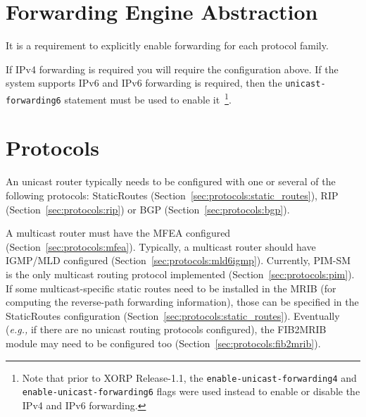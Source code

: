 \documentclass[11pt]{article}
\newcommand{\eg}{\emph{e.g.,}\xspace}
\begin{document}
\section{Forwarding Engine Abstraction}
\label{sec:fea}

It is a requirement to explicitly enable forwarding for each
protocol family.

\vspace{0.1in}
\noindent{}
\vspace{0.1in}

If IPv4 forwarding is required you will require the configuration
above. If the system supports IPv6 and IPv6 forwarding is required,
then the {\tt unicast-forwarding6} statement must be used to enable
it~\footnote{Note that prior to XORP Release-1.1, the
{\tt enable-unicast-forwarding4} and {\tt enable-unicast-forwarding6}
flags were used instead to enable or disable the IPv4 and IPv6 forwarding.}.

\section{Protocols}
\label{sec:protocols}

An unicast router typically needs to be configured with one or several
of the following protocols:
StaticRoutes (Section~\ref{sec:protocols:static_routes}),
RIP (Section~\ref{sec:protocols:rip})
or BGP (Section~\ref{sec:protocols:bgp}).

A multicast router must have the MFEA configured
(Section~\ref{sec:protocols:mfea}). Typically, a multicast router should
have IGMP/MLD configured (Section~\ref{sec:protocols:mld6igmp}).
Currently, PIM-SM is the only multicast routing protocol implemented
(Section~\ref{sec:protocols:pim}). If some multicast-specific static
routes need to be installed in the MRIB (for computing the reverse-path
forwarding information), those can be specified in the StaticRoutes
configuration (Section~\ref{sec:protocols:static_routes}).
Eventually (\eg if there are no
unicast routing protocols configured), the FIB2MRIB module may
need to be configured too (Section~\ref{sec:protocols:fib2mrib}).
\end{document}
